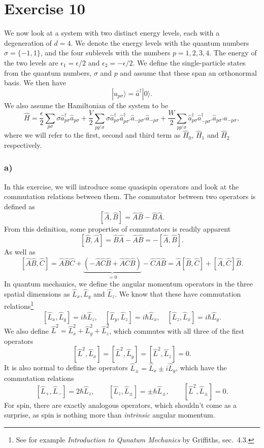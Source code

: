 \documentclass[a4paper, 11pt, notitlepage, english]{article}
\newcommand{\ket}[1]{|#1 \rangle}
\newcommand{\op}[1]{\hat{#1}}
\newcommand{\eps}{\epsilon}
\begin{document}
\clearpage

\section*{Exercise 10}
We now look at a system with two distinct energy levels, each with a degeneration of $d=4$. We denote the energy levels with the quantum numbers $\sigma = \{-1,1\}$, and the four sublevels with the numbers $p=1,2,3,4$. The energy of the two levels are $\eps_1 = \eps/2$ and $\eps_2 = -\eps/2$. We define the single-particle states from the quantum numbers, $\sigma$ and $p$ and assume that these span an orthonormal basis. We then have
$$\ket{u_{p\sigma}} = \op{a}^\dagger \ket{0}.$$
We also assume the Hamiltonian of the system to be
$$\op{H} = \frac{\eps}{2}\sum_{p\sigma} \sigma \op{a}_{p\sigma}^\dagger\op{a}_{p\sigma} + \frac{V}{2}\sum_{pp'\sigma} \sigma \op{a}_{p\sigma}^\dagger \op{a}_{p\sigma'}^\dagger \op{a}_{-p\sigma'} \op{a}_{-p\sigma} +
\frac{W}{2}\sum_{pp'\sigma} \op{a}_{p\sigma}^\dagger \op{a}_{-p\sigma'}^\dagger \op{a}_{p\sigma'} \op{a}_{-p\sigma},$$
where we will refer to the first, second and third term as $\op{H}_0$, $\op{H}_1$ and $\op{H}_2$ respectively.

\subsubsection*{a)}

In this exercise, we will introduce some quasispin operators and look at the commutation relations between them. The commutator between two operators is defined as
$$[\op{A},\op{B}] = \op{A}\op{B} - \op{B}\op{A}.$$
From this definition, some properties of commutators is readily apparent
$$[\op{B},\op{A}] = \op{B}\op{A} - \op{A}\op{B} = -[\op{A},\op{B}].$$
As well as
$$[\op{A}\op{B},\op{C}] =  \op{A}\op{B}\op{C} +\underbrace{(-\op{A}\op{C}\op{B} + \op{A}\op{C}\op{B})}_{=0} - \op{C}\op{A}\op{B} = \op{A}[\op{B},\op{C}] + [\op{A},\op{C}]\op{B}.$$
In quantum mechanics, we define the angular momentum operators in the three spatial dimensions as $\op{L}_x, \op{L}_y$ and $\op{L}_z$. We know that these have commutation relations\footnote{See for example \emph{Introduction to Qunatum Mechanics} by Griffiths, sec.\ 4.3.}
$$[\op{L}_x, \op{L}_y] = i\hbar \op{L}_z, \quad [\op{L}_y, \op{L}_z] = i\hbar \op{L}_x, \quad [\op{L}_z, \op{L}_x] = i\hbar \op{L}_y.$$
We also define $\op{L}^2 = \op{L}_x^2 + \op{L}_y^2 + \op{L}_z^2$, which commutes with all three of the first operators
$$[\op{L}^2, \op{L}_x] = [\op{L}^2, \op{L}_y] = [\op{L}^2, \op{L}_z] = 0.$$
It is also normal to define the operators $\op{L}_\pm = \op{L}_x \pm i\op{L}_y$, which have the commutation relations
$$[\op{L}_+,\op{L}_-] = 2\hbar\op{L}_z, \qquad  [\op{L}_z, \op{L}_\pm] = \pm \hbar \op{L}_\pm, \qquad [\op{L}^2, \op{L}_\pm] = 0.$$
For spin, there are exactly analogous operators, which shouldn't come as a surprise, as spin is nothing more than \emph{intrinsic} angular momentum. 
\end{document}
